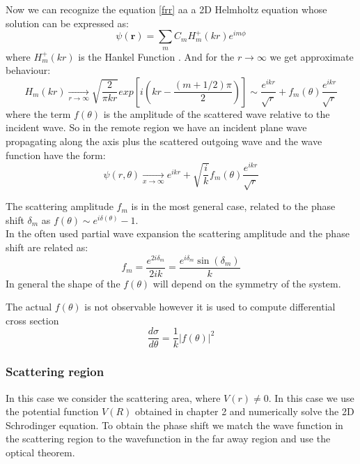 Now we can recognize the equation \eqref{frr} aa a 2D Helmholtz equation whose solution can be expressed as:
\begin{equation}\label{2DS2H}
\psi(\mathbf{r}) = \sum_{m}{C_mH_m^+(kr)e^{im\phi}}
\end{equation}
where $ H_m^+(kr) $ is the Hankel Function .
And for the $ r \rightarrow \infty $ we get approximate behaviour:
\begin{equation}\label{2DS2}
    H_m(kr) \xrightarrow[r \rightarrow \infty]{}\sqrt{\frac{2}{\pi k r}}exp\left[i\left(kr - \frac{(m + 1/2)\pi}{2}\right)\right] \sim \frac{e^{ikr}}{\sqrt{r}} + f_m(\theta) \frac{e^{ikr}}{\sqrt{r}}
\end{equation}
where the term $ f(\theta) $ is the amplitude of the scattered wave relative to the incident wave. 
So in the remote region we have an incident plane wave propagating along the axis plus the scattered outgoing wave and the wave function have the form:
\begin{equation}
    \psi(r,\theta) \xrightarrow[x \to \infty]{} e^{ikr} + \sqrt{\frac{i}{k}}f_m(\theta) \frac{e^{ikr}}{\sqrt{r}}
\end{equation}


The scattering amplitude $ f_m $ is in the most general case, related to the phase shift $ \delta_m $ as $ f(\theta) \sim e^{i\delta(\theta)} - 1 $. \\
In the often used partial wave expansion the scattering amplitude and the phase shift are related as:
\begin{equation}
    f_m = \frac{e^{2i \delta_m}}{2ik} = \frac{e^{i\delta_m}\sin(\delta_m)}{k}
\end{equation}
In general the shape of the $ f(\theta) $ will depend on the symmetry of the system.

The actual $ f(\theta) $ is not observable however it is used to compute differential cross section
\begin{equation}
    \frac{d\sigma}{d\theta} = \frac{1}{k}\left|f(\theta)\right|^2
\end{equation}

\subsubsection{\textbf{Scattering region}}

In this case we consider the scattering area, where $ V(r) \neq 0 $. In this case we use the potential function $ V(R) $ obtained in chapter 2 and numerically solve the 2D Schrodinger equation. To obtain the phase shift we match the wave function in the scattering region to the wavefunction in the far away region and use the optical theorem.

